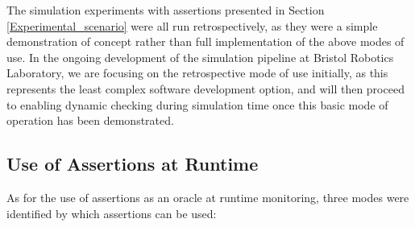 The simulation experiments with assertions presented in Section \ref{Experimental_scenario} were all run retrospectively, as they were a simple demonstration of concept rather than full implementation of the above modes of use. In the ongoing development of the simulation pipeline at Bristol Robotics Laboratory, we are focusing on the retrospective mode of use initially, as this represents the least complex software development option, and will then proceed to enabling dynamic checking during simulation time once this basic mode of operation has been demonstrated. 


\subsection{Use of Assertions at Runtime} \label{assertions_at_run_time}
As for the use of assertions as an oracle at runtime monitoring, three modes were identified by which assertions can be used: 
